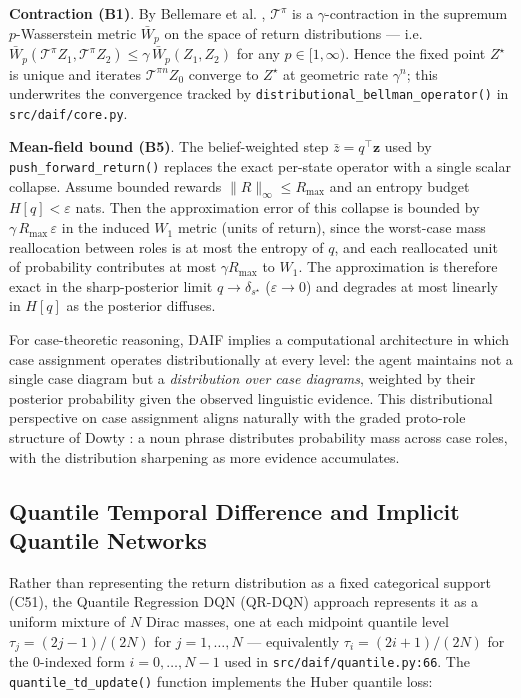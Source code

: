 \documentclass[
]{article}
\begin{document}
\textbf{Contraction (B1)}. By Bellemare et al. \citeyearpar[Theorem
1]{bellemare2017distributional}, \(\mathcal{T}^{\pi}\) is a
\(\gamma\)-contraction in the supremum \(p\)-Wasserstein metric
\(\bar W_p\) on the space of return distributions ---
i.e.~\(\bar W_p(\mathcal{T}^{\pi} Z_1, \mathcal{T}^{\pi} Z_2) \le \gamma\, \bar W_p(Z_1, Z_2)\)
for any \(p \in [1, \infty)\). Hence the fixed point \(Z^\star\) is
unique and iterates \(\mathcal{T}^{\pi n} Z_0\) converge to \(Z^\star\)
at geometric rate \(\gamma^n\); this underwrites the convergence tracked
by \texttt{distributional\_bellman\_operator()} in
\texttt{src/daif/core.py}.

\textbf{Mean-field bound (B5)}. The belief-weighted step
\(\bar z = q^\top \mathbf{z}\) used by \texttt{push\_forward\_return()}
replaces the exact per-state operator with a single scalar collapse.
Assume bounded rewards \(\lVert R\rVert_\infty \le R_{\max}\) and an
entropy budget \(H[q] < \varepsilon\) nats. Then the approximation error
of this collapse is bounded by \(\gamma\,R_{\max}\,\varepsilon\) in the
induced \(W_1\) metric (units of return), since the worst-case mass
reallocation between roles is at most the entropy of \(q\), and each
reallocated unit of probability contributes at most \(\gamma R_{\max}\)
to \(W_1\). The approximation is therefore exact in the sharp-posterior
limit \(q \to \delta_{s^\star}\) (\(\varepsilon \to 0\)) and degrades at
most linearly in \(H[q]\) as the posterior diffuses.

For case-theoretic reasoning, DAIF implies a computational architecture
in which case assignment operates distributionally at every level: the
agent maintains not a single case diagram but a \emph{distribution over
case diagrams}, weighted by their posterior probability given the
observed linguistic evidence. This distributional perspective on case
assignment aligns naturally with the graded proto-role structure of
Dowty \citeyearpar{dowty1991thematic}: a noun phrase distributes
probability mass across case roles, with the distribution sharpening as
more evidence accumulates.

\subsection{Quantile Temporal Difference and Implicit Quantile
Networks}\label{sec:daif-quantile}

Rather than representing the return distribution as a fixed categorical
support (C51), the Quantile Regression DQN (QR-DQN) approach represents
it as a uniform mixture of \(N\) Dirac masses, one at each midpoint
quantile level \(\tau_j = (2j-1)/(2N)\) for \(j = 1,\dots,N\) ---
equivalently \(\tau_i = (2i+1)/(2N)\) for the 0-indexed form
\(i = 0,\dots,N-1\) used in \texttt{src/daif/quantile.py:66}. The
\texttt{quantile\_td\_update()} function implements the Huber quantile
loss:
\end{document}
